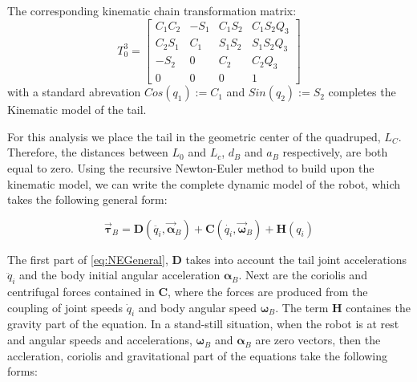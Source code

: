 The corresponding kinematic chain transformation matrix:
\begin{equation}
T_0^3=\begin{bmatrix}
C_1 C_2 & -S_1 & C_1 S_2 & C_1 S_2 Q_3 \\
C_2 S_1 & C_1 & S_1 S_2 & S_1 S_2 Q_3 \\
-S_2 & 0 & C_2 & C_2 Q_3 \\
 0 & 0 & 0 & 1
\end{bmatrix}
\end{equation}
with a standard abrevation $Cos(q_1):=C_1$ and $Sin(q_2):=S_2$ completes the Kinematic model of the tail. 

For this analysis we place the tail in the geometric center of the quadruped, $L_C$. Therefore, the distances between $L_0$ and $L_c$, $d_B$ and $a_B$ respectively, are both equal to zero. Using the recursive Newton-Euler method to build upon the kinematic model, we can write the complete dynamic model of the robot, which takes the following general form:

\begin{equation}\label{eq:NEGeneral}
\vec{\boldsymbol{\tau}}_B=\mathbf{D}\left ( \ddot{q_i},\vec{\boldsymbol{\alpha}}_B \right )+\mathbf{C}\left ( \dot{q_i},\vec{\boldsymbol{\omega}}_B \right )+\mathbf{H}\left ( {q_i} \right )
\end{equation}

The first part of \eqref{eq:NEGeneral}, $\mathbf{D}$ takes into account the tail joint accelerations $\ddot{q}_i$ and the body initial angular acceleration $\boldsymbol{\alpha}_B$. Next are the coriolis and centrifugal forces contained in $\mathbf{C}$, where the forces are produced from the coupling of joint speeds $\dot{q}_i$ and body angular speed $\boldsymbol{\omega}_B$. The term $\mathbf{H}$ containes the gravity part of the equation. In a stand-still situation, when the robot is at rest and angular speeds and accelerations,  $\boldsymbol{\omega}_B$ and  $\boldsymbol{\alpha}_B$ are zero vectors, then the accleration, coriolis and gravitational part of the equations take the following forms:
 
